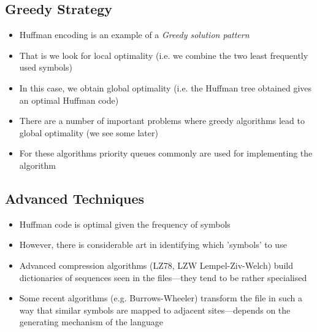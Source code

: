 \begin{slide}
\section{Greedy Strategy}

\begin{PauseHighLight}
  \begin{itemize}
  \item Huffman encoding is an example of a \emph{Greedy solution
      pattern}\pause
  \item That is we look for local optimality (i.e. we combine the two
    least frequently used symbols)\pause
  \item In this case, we obtain global optimality (i.e. the Huffman tree
    obtained gives an optimal Huffman code)\pause
  \item There are a number of important problems where greedy algorithms
    lead to global optimality (we see some later)\pause
  \item For these algorithms priority queues commonly are used for
    implementing the algorithm\pause
  \end{itemize}
\end{PauseHighLight}

\end{slide}


\begin{slide}
\section{Advanced Techniques}

\begin{PauseHighLight}
  \begin{itemize}
  \item Huffman code is optimal given the frequency of symbols\pause
  \item However, there is considerable art in identifying which
    'symbols' to use\pause
  \item Advanced compression algorithms (LZ78, LZW Lempel-Ziv-Welch) build
    dictionaries of sequences seen in the files---they tend to be rather
    specialised\pause
  \item Some recent algorithms (e.g. Burrows-Wheeler) transform the file
    in such a way that similar symbols are mapped to adjacent
    sites---depends on the generating mechanism of the language\pause
  \end{itemize}
\end{PauseHighLight}

\end{slide}

